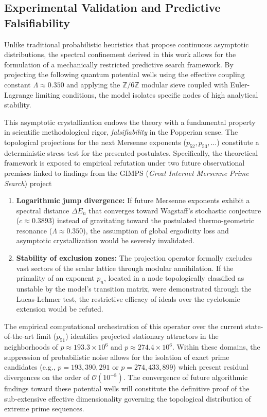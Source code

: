 \documentclass{article}
\numberwithin{equation}{section}
\theoremstyle{plain}
\theoremstyle{definition}
\begin{document}
\subsection{Experimental Validation and Predictive Falsifiability}

Unlike traditional probabilistic heuristics that propose continuous asymptotic distributions, the spectral confinement derived in this work allows for the formulation of a mechanically restricted predictive search framework. By projecting the following quantum potential wells using the effective coupling constant $\Lambda \approx 0.350$ and applying the $\mathbb{Z}/6\mathbb{Z}$ modular sieve coupled with Euler-Lagrange limiting conditions, the model isolates specific nodes of high analytical stability.

This asymptotic crystallization endows the theory with a fundamental property in scientific methodological rigor, \textit{falsifiability} in the Popperian sense. The topological projections for the next Mersenne exponents ($p_{52}, p_{53}, \dots$) constitute a deterministic stress test for the presented postulates. Specifically, the theoretical framework is exposed to empirical refutation under two future observational premises linked to findings from the GIMPS (\textit{Great Internet Mersenne Prime Search}) project
\begin{enumerate}
    \item \textbf{Logarithmic jump divergence:} If future Mersenne exponents exhibit a spectral distance $\Delta E_n$ that converges toward Wagstaff's stochastic conjecture ($c \approx 0.3893$) instead of gravitating toward the postulated thermo-geometric resonance ($\Lambda \approx 0.350$), the assumption of global ergodicity loss and asymptotic crystallization would be severely invalidated.
    \item \textbf{Stability of exclusion zones:} The projection operator formally excludes vast sectors of the scalar lattice through modular annihilation. If the primality of an exponent $p_n$, located in a node topologically classified as unstable by the model's transition matrix, were demonstrated through the Lucas-Lehmer test, the restrictive efficacy of ideals over the cyclotomic extension would be refuted.
\end{enumerate}

The empirical computational orchestration of this operator over the current state-of-the-art limit ($p_{51}$) identifies projected stationary attractors in the neighborhoods of $p \approx 193.3 \times 10^6$ and $p \approx 274.4 \times 10^6$. Within these domains, the suppression of probabilistic noise allows for the isolation of exact prime candidates (e.g., $p = 193,390,291$ or $p = 274,433,899$) which present residual divergences on the order of $\mathcal{O}(10^{-8})$. The convergence of future algorithmic findings toward these potential wells will constitute the definitive proof of the sub-extensive effective dimensionality governing the topological distribution of extreme prime sequences.
\end{document}
